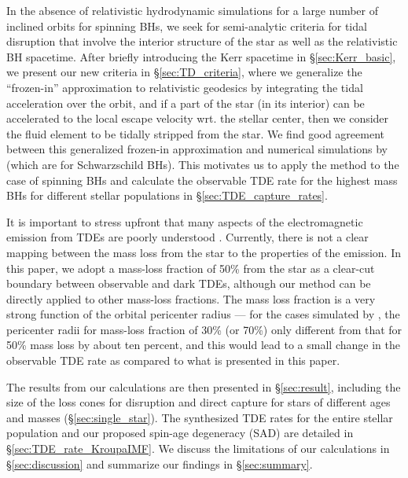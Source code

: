 \documentclass[useAMS,usenatbib]{mn2e}
\begin{document}
In the absence of relativistic hydrodynamic simulations for a large number of inclined orbits for spinning BHs, we seek for semi-analytic criteria for tidal disruption that involve the interior structure of the star as well as the relativistic BH spacetime. After briefly introducing the Kerr spacetime in \S \ref{sec:Kerr_basic}, we present our new criteria in \S \ref{sec:TD_criteria}, where we generalize the ``frozen-in'' approximation \citep[as adopted in the Newtonian limit by][]{Lodato2009, stone13_frozen-in, steinberg19_frozen-in} to relativistic geodesics by integrating the tidal acceleration over the orbit, and if a part of the star (in its interior) can be accelerated to the local escape velocity wrt. the stellar center, then we consider the fluid element to be tidally stripped from the star. We find good agreement between this generalized frozen-in approximation and numerical simulations by \citet{Ryu2020d} (which are for Schwarzschild BHs). This motivates us to apply the method to the case of spinning BHs and calculate the observable TDE rate for the highest mass BHs for different stellar populations in \S \ref{sec:TDE_capture_rates}.

It is important to stress upfront that many aspects of the electromagnetic emission from TDEs are poorly understood \citep[the origin of optical emission in particular, see e.g.,][]{piran15_shock_power, metzger16_bright_year, roth16_optical_emission, dai18_unified_model, lu20_optical_emission, bonnerot21_first_light, andalman22_global_GRHD, steinberg22_peak_light}. Currently, there is not a clear mapping between the mass loss from the star to the properties of the emission. In this paper, we adopt a mass-loss fraction of 50\% from the star as a clear-cut boundary between observable and dark TDEs, although our method can be directly applied to other mass-loss fractions. The mass loss fraction is a very strong function of the orbital pericenter radius --- for the cases simulated by \citet{Ryu2020d}, the pericenter radii for mass-loss fraction of 30\% (or 70\%) only different from that for 50\% mass loss by about ten percent, and this would lead to a small change in the observable TDE rate as compared to what is presented in this paper.

The results from our calculations are then presented in \S \ref{sec:result}, including the size of the loss cones for disruption and direct capture for stars of different ages and masses (\S \ref{sec:single_star}). The synthesized TDE rates for the entire stellar population and our proposed spin-age degeneracy
(SAD) are detailed in \S \ref{sec:TDE_rate_KroupaIMF}. We discuss the limitations of our calculations in \S \ref{sec:discussion} and summarize our findings in \S \ref{sec:summary}.
\end{document}
